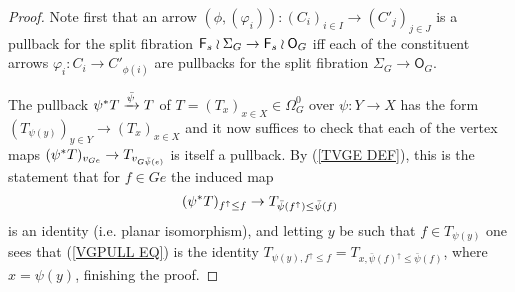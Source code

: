 \documentclass[a4paper,10pt]{article}%
\begin{document}
\begin{proof}
Note first that an arrow 
$(\phi,(\varphi_i))\colon (C_i)_{i \in I} \to (C'_j)_{j\in J}$
is a pullback for the split fibration 
$\mathsf{F}_s \wr \Sigma_G \to \mathsf{F}_s \wr \mathsf{O}_G$
iff each of the constituent arrows
$\varphi_i \colon C_i \to C'_{\phi(i)}$
are pullbacks for the split fibration $\Sigma_G \to \mathsf{O}_G$.

The pullback
$\psi^{\**} T \xrightarrow{\bar{\psi}} T$
of $T = (T_x)_{x \in X} \in \Omega_{G}^{0}$
over $\psi \colon Y \to X$
has the form 
$(T_{\psi(y)})_{y \in Y} \to (T_x)_{x \in X}$
and it now suffices to check that each of the vertex maps
$
	(\psi^{\**} T)_{v_{G e}} \to T_{v_{G \bar{\psi}(e)}}
$
is itself a pullback.
By (\ref{TVGE DEF}), this is the statement that for 
$f \in G e$ the induced map
\begin{equation}\label{VGPULL EQ}
	(\psi^{\**}T)_{f^{\uparrow} \leq f} \to 
	T_{\bar{\psi}(f^{\uparrow}) \leq \bar{\psi} (f)}
\end{equation}
is an identity (i.e. planar isomorphism),
and letting $y$ be such that $f \in T_{\psi(y)}$
one sees that (\ref{VGPULL EQ})
is the identity
$T_{\psi(y),f^{\uparrow} \leq f} = 
T_{x,\bar{\psi}(f)^{\uparrow} \leq \bar{\psi}(f)}$, where $x=\psi(y)$, finishing the proof.
\end{proof}
\end{document}
